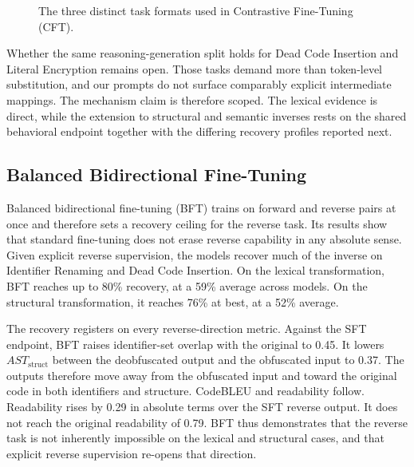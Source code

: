 \begin{figure}[ht]
    \caption{The three distinct task formats used in Contrastive Fine-Tuning (CFT).}
    \label{fig:contrastive_prompting}
    \vspace{-0.45cm}
\end{figure}

Whether the same reasoning-generation split holds for Dead Code Insertion and
Literal Encryption remains open. Those tasks demand more than token-level
substitution, and our prompts do not surface comparably explicit intermediate
mappings. The mechanism claim is therefore scoped. The lexical evidence is
direct, while the extension to structural and semantic inverses rests on the
shared behavioral endpoint together with the differing recovery profiles reported
next.


\subsection{Balanced Bidirectional Fine-Tuning}
\label{sec:bft}



Balanced bidirectional fine-tuning (BFT) trains on forward and reverse pairs at
once and therefore sets a recovery ceiling for the reverse task. Its results show
that standard fine-tuning does not erase reverse capability in any absolute
sense. Given explicit reverse supervision, the models recover much of the inverse
on Identifier Renaming and Dead Code Insertion. On the lexical transformation,
BFT reaches up to 80\% recovery, at a 59\% average across models. On the
structural transformation, it reaches 76\% at best, at a 52\% average.


The recovery registers on every reverse-direction metric. Against the SFT
endpoint, BFT raises identifier-set overlap with the original to 0.45.
It lowers $AST_{\text{struct}}$ between the deobfuscated output and the
obfuscated input to 0.37.
The outputs therefore move away from the obfuscated input and toward the
original code in both identifiers and structure. CodeBLEU and readability follow.
Readability rises by 0.29 in absolute terms over the SFT reverse output.
It does not reach the original readability of 0.79. BFT thus demonstrates
that the reverse task is not inherently impossible on the lexical and structural
cases, and that explicit reverse supervision re-opens that direction.



